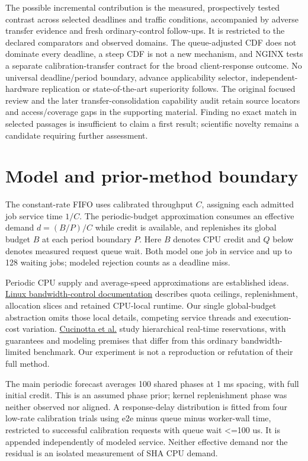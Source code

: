 \documentclass[11pt,a4paper]{article}
\begin{document}
The possible incremental contribution is the measured, prospectively tested
contrast across selected deadlines and traffic conditions, accompanied by
adverse transfer evidence and fresh ordinary-control follow-ups. It is restricted to the declared comparators and
observed domains. The queue-adjusted CDF does not dominate every deadline,
a steep CDF is not a new mechanism, and NGINX tests a separate calibration-transfer
contract for the broad client-response outcome.
No universal deadline/period boundary, advance applicability selector,
independent-hardware replication or state-of-the-art superiority follows.
The original focused review and the later transfer-consolidation capability
audit retain source locators and access/coverage gaps in the supporting material.
Finding no exact match in selected passages is insufficient to claim a first
result; scientific novelty remains a candidate requiring further assessment.

\section{Model and prior-method boundary}

The constant-rate FIFO uses calibrated throughput $C$, assigning each admitted
job service time $1/C$. The periodic-budget approximation consumes an effective
demand $d = (B/P)/C$ while credit is available, and replenishes its global budget
$B$ at each period boundary $P$. Here $B$ denotes CPU credit and $Q$ below denotes
measured request queue wait. Both model one job in service and up to 128 waiting
jobs; modeled rejection counts as a deadline miss.

Periodic CPU supply and average-speed approximations are established ideas.
\href{https://docs.kernel.org/scheduler/sched-bwc.html}{Linux bandwidth-control documentation}
describes quota ceilings, replenishment, allocation slices and retained
CPU-local runtime. Our single global-budget abstraction omits those local
details, competing service threads and execution-cost variation.
\href{https://retis.santannapisa.it/people/nino/publication/TCC23.pdf}{Cucinotta et al.}
study hierarchical real-time reservations, with guarantees and modeling
premises that differ from this ordinary bandwidth-limited benchmark. Our
experiment is not a reproduction or refutation of their full method.

The main periodic forecast averages 100 shared phases at 1 ms spacing, with
full initial credit. This is an assumed phase prior; kernel replenishment phase
was neither observed nor aligned. A response-delay distribution is fitted
from four low-rate calibration trials using e2e minus queue minus worker-wall
time, restricted to successful calibration requests with queue wait <=100 us.
It is appended independently of modeled service. Neither effective demand nor
the residual is an isolated measurement of SHA CPU demand.
\end{document}
